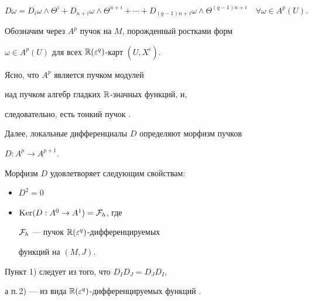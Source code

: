 $$


D \omega = D_{i} \omega \wedge \Theta


^{i} + D_{n+i} \omega \wedge \Theta ^{n+i} + \dotsb +


D_{(q-1)n+i} \omega \wedge \Theta ^{(q-1)n+i}


\quad \forall \omega \in  A^{p}(U).


$$





Обозначим через $A^{p}$ пучок на $M$, порожденный ростками форм


$\omega \in A^{p}(U)$ для всех $\Bbb R(\varepsilon^q)$-карт $(U, X^i)$.


Ясно, что $A^{p}$ является пучком модулей


над пучком алгебр гладких $\Bbb R$-значных функций, и,


следовательно, есть тонкий пучок \cite{W}.





Далее, локальные дифференциалы $D$ определяют морфизм пучков


$D: A^{p} \to A^{p+1}$.





\begin{assrt}


Морфизм $D$ удовлетворяет следующим свойствам:


\begin{itemize}


\item[1)] $D^2 = 0$


\item[2)] ${\operatorname{Ker}}(D : A^{0} \to A^{1}) = {\cal F}_h$, где


${\cal F}_h$ --- пучок ${\Bbb R}(\varepsilon^{q})$-дифференцируемых


функций на $(M,J)$.  \label{U}


\end{itemize}


\end{assrt}





\begin{pf} Пункт 1) следует из того, что $D_{I}D_{J}=D_{J}D_{I}$,


а п.\,2) --- из вида $\Bbb R(\varepsilon^q)$-дифференцируемых функций \cite{Vish}.


\end{pf}





